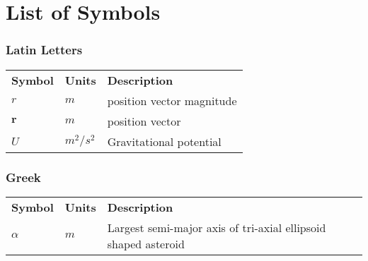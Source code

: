 \chapter*{List of Symbols}
\label{los}

\subsection*{Latin Letters}
\begin{longtable}[l]{p{100pt} p{70pt} p{250pt}}
\textbf{Symbol} & \textbf{Units} & \textbf{Description}             \\

$r$             & $m$           & position vector magnitude         \\
$\mathbf{r}$    & $m$           & position vector                   \\
$U$             & $m^2/s^2$     & Gravitational potential           \\
\end{longtable}

\subsection*{Greek}
\begin{longtable}[l]{p{100pt} p{70pt} p{250pt}}
\textbf{Symbol} & \textbf{Units} & \textbf{Description}             \\

$\alpha$        & $m$           & Largest semi-major axis of tri-axial ellipsoid shaped asteroid \\
\end{longtable}

